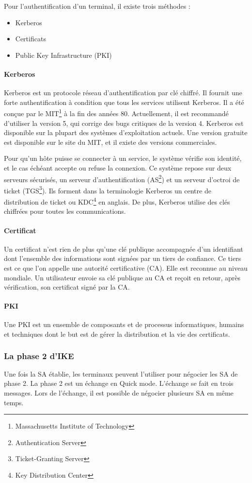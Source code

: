 Pour l'authentification d'un terminal, il existe trois méthodes : 
\begin{itemize}
	\item Kerberos
	\item Certificats	
	\item Public Key Infrastructure (PKI)
\end{itemize}

\paragraph{Kerberos}
Kerberos est un protocole réseau d'authentification par clé chiffré.
Il fournit une forte authentification à condition que tous les services utilisent Kerberos.
Il a été conçue par le MIT\footnote{Massachusetts Institute of Technology} à la fin des années 80.
Actuellement, il est recommandé d'utiliser la version 5, qui corrige des bugs critiques de la version 4.
Kerberos est disponible sur la plupart des systèmes d'exploitation actuels.
Une version gratuite est disponible sur le site du MIT, et il existe des versions commerciales.

Pour qu'un hôte puisse se connecter à un service, le système vérifie son identité, et le cas échéant accepte ou refuse la connexion.
Ce système repose sur deux serveurs sécurisés, un serveur d'authentification (AS\footnote{Authentication Server}) et un serveur d'octroi de ticket (TGS\footnote{Ticket-Granting Server}).
Ils forment dans la terminologie Kerberos un centre de distribution de ticket ou KDC\footnote{Key Distribution Center} en anglais.
De plus, Kerberos utilise des clés chiffrées pour toutes les communications.

\paragraph{Certificat}
Un certificat n'est rien de plus qu'une clé publique accompagnée d'un identifiant dont l'ensemble des informations sont signées par un tiers de confiance.
Ce tiers est ce que l'on appelle une autorité certificative (CA). 
Elle est reconnue au niveau mondiale.
Un utilisateur envoie sa clé publique au CA et reçoit en retour, après vérification, son certificat signé par la CA.

\paragraph{PKI}
Une PKI est un ensemble de composants et de processus informatiques, humains et techniques dont le but est de gérer la distribution et la vie des certificats.

\subsubsection{La phase 2 d'IKE}
Une fois la SA établie, les terminaux peuvent l'utiliser pour négocier les SA de phase 2. 
La phase 2 est un échange en Quick mode. 
L'échange se fait en trois messages. 
Lors de l'échange, il est possible de négocier plusieurs SA en même temps. 